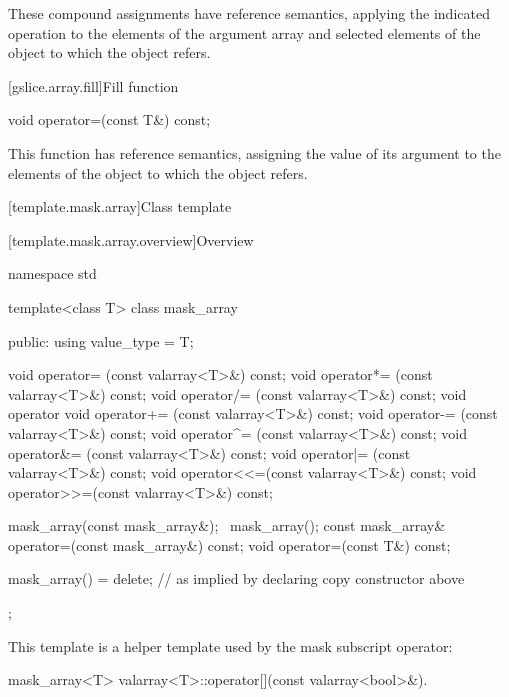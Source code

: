 \begin{itemdescr}
\pnum
These compound assignments have reference semantics, applying the
indicated operation to the elements of the argument array and selected
elements of the
object to which the
object refers.
\end{itemdescr}

[gslice.array.fill]{Fill function}

%
\begin{itemdecl}
void operator=(const T&) const;
\end{itemdecl}

\begin{itemdescr}
\pnum
This function has reference semantics, assigning the value of its argument
to the elements of the
object to which the
object refers.
\end{itemdescr}

[template.mask.array]{Class template }

[template.mask.array.overview]{Overview}

%
%
\begin{codeblock}
namespace std {
  template<class T> class mask_array {
  public:
    using value_type = T;

    void operator=  (const valarray<T>&) const;
    void operator*= (const valarray<T>&) const;
    void operator/= (const valarray<T>&) const;
    void operator%
    void operator+= (const valarray<T>&) const;
    void operator-= (const valarray<T>&) const;
    void operator^= (const valarray<T>&) const;
    void operator&= (const valarray<T>&) const;
    void operator|= (const valarray<T>&) const;
    void operator<<=(const valarray<T>&) const;
    void operator>>=(const valarray<T>&) const;

    mask_array(const mask_array&);
    ~mask_array();
    const mask_array& operator=(const mask_array&) const;
    void operator=(const T&) const;

    mask_array() = delete;      // as implied by declaring copy constructor above
  };
}
\end{codeblock}

\pnum
This template is a helper template used by the mask subscript operator:

%
\begin{itemdecl}
mask_array<T> valarray<T>::operator[](const valarray<bool>&).
\end{itemdecl}

